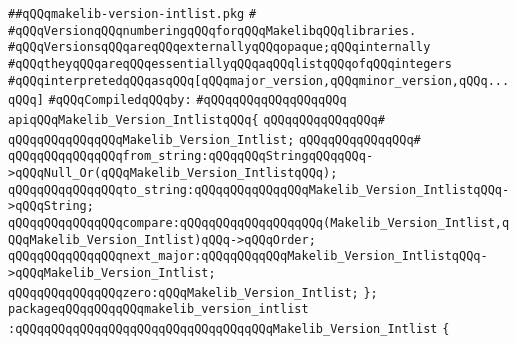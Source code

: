\label{src/app/makelib/stuff/makelib-version-intlist.pkg}
\verb|##qQQqmakelib-version-intlist.pkg|\newline
\verb|#|\newline
\verb|#qQQqVersionqQQqnumberingqQQqforqQQqMakelibqQQqlibraries.|\newline
\verb|#qQQqVersionsqQQqareqQQqexternallyqQQqopaque;qQQqinternally|\newline
\verb|#qQQqtheyqQQqareqQQqessentiallyqQQqaqQQqlistqQQqofqQQqintegers|\newline
\verb|#qQQqinterpretedqQQqasqQQq[qQQqmajor_version,qQQqminor_version,qQQq...qQQq]|\newline
\newline
\verb|#qQQqCompiledqQQqby:|\newline
\verb|#qQQqqQQqqQQqqQQqqQQq|\newline
\newline
\newline
\newline
\verb|apiqQQqMakelib_Version_IntlistqQQq{|\newline
\verb|qQQqqQQqqQQqqQQq#|\newline
\verb|qQQqqQQqqQQqqQQqMakelib_Version_Intlist;|\newline
\verb|qQQqqQQqqQQqqQQq#|\newline
\verb|qQQqqQQqqQQqqQQqfrom_string:qQQqqQQqStringqQQqqQQq->qQQqNull_Or(qQQqMakelib_Version_IntlistqQQq);|\newline
\verb|qQQqqQQqqQQqqQQqto_string:qQQqqQQqqQQqqQQqMakelib_Version_IntlistqQQq->qQQqString;|\newline
\verb|qQQqqQQqqQQqqQQqcompare:qQQqqQQqqQQqqQQqqQQq(Makelib_Version_Intlist,qQQqMakelib_Version_Intlist)qQQq->qQQqOrder;|\newline
\newline
\verb|qQQqqQQqqQQqqQQqnext_major:qQQqqQQqqQQqMakelib_Version_IntlistqQQq->qQQqMakelib_Version_Intlist;|\newline
\newline
\verb|qQQqqQQqqQQqqQQqzero:qQQqMakelib_Version_Intlist;|\newline
\verb|};|\newline
\newline
\verb|packageqQQqqQQqqQQqmakelib_version_intlist|\newline
\verb|:qQQqqQQqqQQqqQQqqQQqqQQqqQQqqQQqqQQqMakelib_Version_Intlist|\newline
\verb|{|\newline
